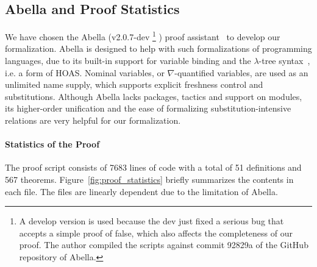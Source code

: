 \subsection{Abella and Proof Statistics}
We have chosen the Abella (v2.0.7-dev
\footnote{A develop version is used because the dev just fixed a serious bug that
accepts a simple proof of false, which also affects the completeness of our proof.
The author compiled the scripts against commit 92829a of the GitHub repository of Abella.}
) proof assistant~\cite{AbellaDesc} to develop our formalization.
Abella is designed to help with such formalizations of programming languages,
due to its built-in support for variable binding and
the $\lambda$-tree syntax~\cite{miller2000abstract}, i.e. a form of HOAS.
Nominal variables, or $\nabla$-quantified variables, are used as an unlimited name supply,
which supports explicit freshness control and substitutions.
Although Abella lacks packages, tactics and support on modules,
its higher-order unification and the ease of formalizing substitution-intensive relations
are very helpful for our formalization.

\paragraph{Statistics of the Proof}
The proof script consists of 7683 lines of code with a total of
51 definitions and 567 theorems.
Figure~\ref{fig:proof_statistics} briefly summarizes the contents in each file.
The files are linearly dependent due to the limitation of Abella.


